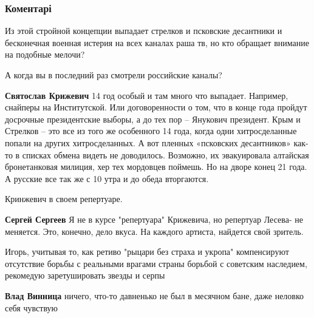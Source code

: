  
 
 
 
 
\subsubsection{Коментарі}

\begin{itemize} %
Из этой стройной концепции выпадает стрелков и псковские десантники и бесконечная военная истерия на всех каналах раша тв, но кто обращает внимание на подобные мелочи?

\begin{itemize} %
А когда вы в последний раз смотрели российские каналы?

\textbf{Святослав Крижевич} 14 год особый и там много что выпадает. Например, снайперы на Институтской. Или договоренности о том, что в конце года пройдут досрочные президентские выборы, а до тех пор – Янукович президент. Крым и Стрелков – это все из того же особенного 14 года, когда одни хитросделанные попали на других хитросделанных. А вот пленных «псковских десантников» как-то в списках обмена видеть не доводилось. Возможно, их эвакуировала алтайская бронетанковая милиция, хер тех мордовцев поймешь. Но на дворе конец 21 года. А русские все так же с 10 утра и до обеда вторгаются.

Кринжевич в своем репертуаре.

\textbf{Сергей Сергеев} Я не в курсе "репертуара" Крижевича, но репертуар Лесева- не меняется. Это, конечно, дело вкуса. На каждого артиста, найдется свой зритель.
\end{itemize} %


Игорь, учитывая то, как ретиво "рыцари без страха и укропа" компенсируют
отсутствие борьбы с реальными врагами страны борьбой с советским наследием,
рекомедую заретушировать звезды и серпы

\begin{itemize} %
\textbf{Влад Винница} ничего, что-то давненько не был в месячном бане, даже неловко себя чувствую


\end{itemize}
\end{itemize}
